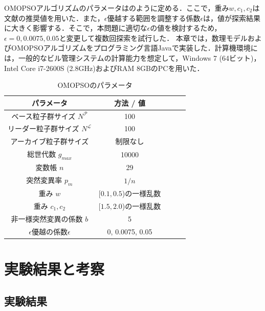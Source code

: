 OMOPSOアルゴリズムのパラメータはのように定める．ここで，重み$w, c_1, c_2$は文献\cite{Sierra05}の推奨値を用いた．また，$\epsilon$優越する範囲を調整する係数$\epsilon$は，値が探索結果に大きく影響する．そこで，本問題に適切な$\epsilon$の値を検討するため，$\epsilon=0, 0.0075, 0.05$と変更して複数回探索を試行した．
本章では，数理モデルおよびOMOPSOアルゴリズムをプログラミング言語Javaで実装した．計算機環境には，一般的なビル管理システムの計算能力を想定して，Windows 7 (64ビット)，Intel Core i7-2600S (2.8GHz)およびRAM 8GBのPCを用いた．

\begin{table}[t]
  {\small
    \begin{center}
      \caption{OMOPSOのパラメータ}
      \label{tab::math_param_algo}
      \begin{tabular}{c|cccc}
        \hline
        パラメータ                             & 方法 / 値              \\
        \hline \hline
        ベース粒子群サイズ $N^{\mathcal{P}}$   & 100                    \\
        リーダー粒子群サイズ $N^{\mathcal{L}}$ & 100                    \\
        アーカイブ粒子群サイズ                 & 制限なし               \\
        総世代数 $g_{max}$                     & 10000                  \\
        変数帳 $n$                             & 29                     \\
        突然変異率 $p_m$                       & $1/n$                  \\
        重み $w$                               & [$0.1, 0.5$)の一様乱数 \\
        重み $c_1, c_2$                        & [$1.5, 2.0$)の一様乱数 \\
        非一様突然変異の係数 $b$               & 5 \cite{Esquivel03}    \\
        $\epsilon$優越の係数$\epsilon$         & 0, 0.0075, 0.05        \\
        \hline
      \end{tabular}
    \end{center}
  }
\end{table}

\section{実験結果と考察}
\subsection{実験結果}

